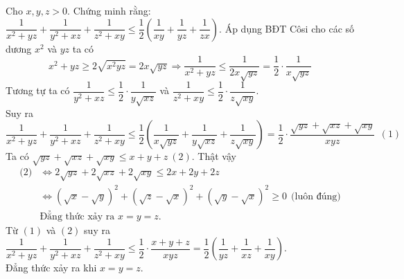 \begin{ex}%
	Cho $x,y,z > 0$. Chứng minh rằng: $\dfrac{1}{x^2 + yz} + \dfrac{1}{y^2 + xz} + \dfrac{1}{z^2 + xy} \le \dfrac{1}{2} \left(\dfrac{1}{xy} + \dfrac{1}{yz} + \dfrac{1}{zx}\right)$.
	\loigiai
	{
		Áp dụng BĐT Côsi cho các số dương $x^2$ và $yz$ ta có
		\[x^2+yz \ge 2 \sqrt{x^2yz} = 2x \sqrt{yz} \Rightarrow  \dfrac{1}{x^2+yz} \le \dfrac{1}{2x \sqrt{yz}} = \dfrac{1}{2} \cdot  \dfrac{1}{x \sqrt{yz}}\]
		Tương tự ta có $\dfrac{1}{y^2+xz}\le \dfrac{1}{2}\cdot \dfrac{1}{y\sqrt{xz}}$ và $\dfrac{1}{z^2+xy}\le \dfrac{1}{2}\cdot \dfrac{1}{z\sqrt{xy}}$. \\
		Suy ra
		\[\dfrac{1}{x^2+yz}+\dfrac{1}{y^2+xz}+\dfrac{1}{z^2+xy}\le \dfrac{1}{2}\left(\dfrac{1}{x\sqrt{yz}}+\dfrac{1}{y\sqrt{xz}}+\dfrac{1}{z\sqrt{xy}}\right)=\dfrac{1}{2}\cdot \dfrac{\sqrt{yz}+\sqrt{xz}+\sqrt{xy}}{xyz}~~(1)\]
		Ta có $\sqrt{yz}+\sqrt{xz}+\sqrt{xy}\le x+y+z~(2)$. Thật vậy
			\begin{align*}
				\text{(2)} &\Leftrightarrow 2\sqrt{yz}+2\sqrt{xz}+2\sqrt{xy}\le 2x+2y+2z \\
				&\Leftrightarrow {\left(\sqrt{x}-\sqrt{y}\right)}^2+{\left(\sqrt{z}-\sqrt{x}\right)}^2+{\left(\sqrt{y}-\sqrt{x}\right)}^2\ge 0~~\text{(luôn đúng)} \\
				&\text{Đẳng thức xảy ra } x = y = z.
			\end{align*}
		Từ $(1)$ và $(2)$ suy ra $\dfrac{1}{x^2+yz}+\dfrac{1}{y^2+xz}+\dfrac{1}{z^2+xy}\le \dfrac{1}{2}\cdot \dfrac{x+y+z}{xyz}=\dfrac{1}{2}\left(\dfrac{1}{yz}+\dfrac{1}{xz}+\dfrac{1}{xy}\right)$. \\
		Đẳng thức xảy ra khi $x = y = z$.
	}
\end{ex}

